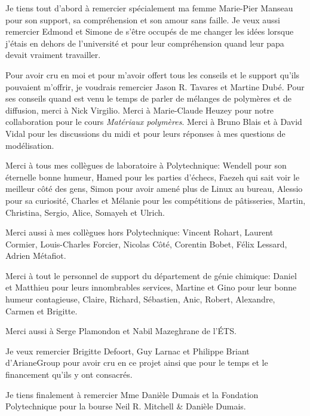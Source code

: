 %
%
Je tiens tout d'abord à remercier spécialement ma femme Marie-Pier Manseau pour son support, sa compréhension et son amour sans faille. 
Je veux aussi remercier Edmond et Simone de s'être occupés de me changer les idées lorsque j'étais en dehors de l'université et pour leur compréhension quand leur papa devait vraiment travailler. 

Pour avoir cru en moi et pour m'avoir offert tous les conseils et le support qu'ils pouvaient m'offrir, je voudrais remercier Jason R. Tavares et Martine Dubé. 
Pour ses conseils quand est venu le temps de parler de mélanges de polymères et de diffusion, merci à Nick Virgilio. 
Merci à Marie-Claude Heuzey pour notre collaboration pour le cours \textit{Matériaux polymères}. 
Merci à Bruno Blais et à David Vidal pour les discussions du midi et pour leurs réponses à mes questions de modélisation. 

Merci à tous mes collègues de laboratoire à Polytechnique: Wendell pour son éternelle bonne humeur, Hamed pour les parties d'échecs, Faezeh qui sait voir le meilleur côté des gens, Simon pour avoir amené plus de Linux au bureau, Alessio pour sa curiosité, Charles et Mélanie pour les compétitions de pâtisseries, Martin, Christina, Sergio, Alice, Somayeh et Ulrich.

Merci aussi à mes collègues hors Polytechnique: Vincent Rohart, Laurent Cormier, Louis-Charles Forcier, Nicolas Côté, Corentin Bobet, Félix Lessard, Adrien Métafiot. 

Merci à tout le personnel de support du département de génie chimique: Daniel et Matthieu pour leurs innombrables services, Martine et Gino pour leur bonne humeur contagieuse, Claire, Richard, Sébastien, Anic, Robert, Alexandre, Carmen et Brigitte. 

Merci aussi à Serge Plamondon et Nabil Mazeghrane de l'ÉTS. 

Je veux remercier Brigitte Defoort, Guy Larnac et Philippe Briant d'ArianeGroup pour avoir cru en ce projet ainsi que pour le temps et le financement qu'ils y ont consacrés. 

Je tiens finalement à remercier Mme Danièle Dumais et la Fondation Polytechnique pour la bourse Neil R. Mitchell \& Danièle Dumais. 
